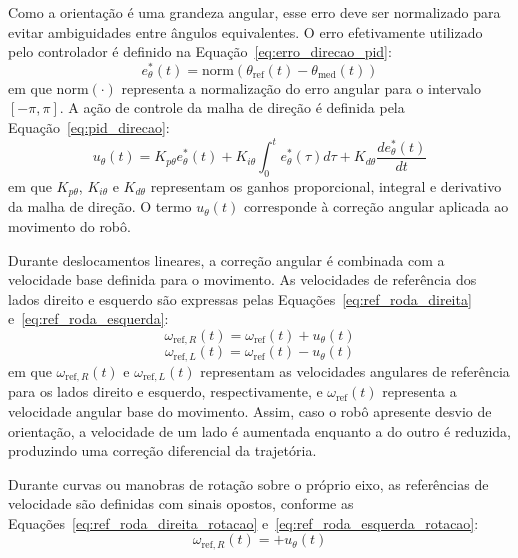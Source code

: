 \documentclass[	12pt, Times, openright, twoside, a4paper, english, brazil]{abntex2}
\begin{document}
Como a orientação é uma grandeza angular, esse erro deve ser normalizado para evitar ambiguidades entre ângulos equivalentes. O erro efetivamente utilizado pelo controlador é definido na Equação~\ref{eq:erro_direcao_pid}:
\begin{equation}
	e_{\theta}^{*}(t) =
	\mathrm{norm}\left(\theta_{\text{ref}}(t) - \theta_{\text{med}}(t)\right)
	\label{eq:erro_direcao_pid}
\end{equation}
em que $\mathrm{norm}(\cdot)$ representa a normalização do erro angular para o intervalo $[-\pi,\pi]$. A ação de controle da malha de direção é definida pela Equação~\ref{eq:pid_direcao}:
\begin{equation}
	u_{\theta}(t) =
	K_{p\theta} e_{\theta}^{*}(t)
	+ K_{i\theta} \int_0^{t}e_{\theta}^{*}(\tau)d\tau
	+ K_{d\theta}\frac{de_{\theta}^{*}(t)}{dt}
	\label{eq:pid_direcao}
\end{equation}
em que $K_{p\theta}$, $K_{i\theta}$ e $K_{d\theta}$ representam os ganhos proporcional, integral e derivativo da malha de direção. O termo $u_{\theta}(t)$ corresponde à correção angular aplicada ao movimento do robô.

Durante deslocamentos lineares, a correção angular é combinada com a velocidade base definida para o movimento. As velocidades de referência dos lados direito e esquerdo são expressas pelas Equações~\ref{eq:ref_roda_direita} e~\ref{eq:ref_roda_esquerda}:
\begin{equation}
	\omega_{\text{ref},R}(t) = \omega_{\text{ref}}(t) + u_{\theta}(t)
	\label{eq:ref_roda_direita}
\end{equation}
\begin{equation}
	\omega_{\text{ref},L}(t) = \omega_{\text{ref}}(t) - u_{\theta}(t)
	\label{eq:ref_roda_esquerda}
\end{equation}
em que $\omega_{\text{ref},R}(t)$ e $\omega_{\text{ref},L}(t)$ representam as velocidades angulares de referência para os lados direito e esquerdo, respectivamente, e $\omega_{\text{ref}}(t)$ representa a velocidade angular base do movimento. Assim, caso o robô apresente desvio de orientação, a velocidade de um lado é aumentada enquanto a do outro é reduzida, produzindo uma correção diferencial da trajetória.

Durante curvas ou manobras de rotação sobre o próprio eixo, as referências de velocidade são definidas com sinais opostos, conforme as Equações~\ref{eq:ref_roda_direita_rotacao} e~\ref{eq:ref_roda_esquerda_rotacao}:
\begin{equation}
	\omega_{\text{ref},R}(t) = +u_{\theta}(t)
	\label{eq:ref_roda_direita_rotacao}
\end{equation}
\end{document}
